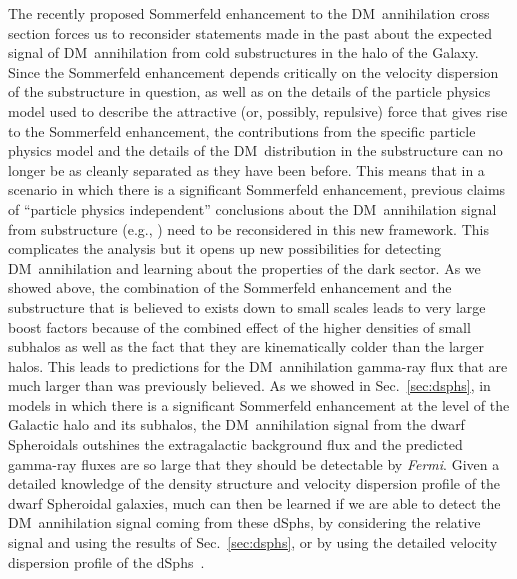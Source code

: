 \documentclass[aps,prd,twocolumn,amsmath,amssymb,floatfix,nofootinbib,10pt]{revtex4}
\newcommand{\eg}{e.g.}
\newcommand{\Fermi}{\emph{Fermi}}
\newcommand{\DM}{DM}
\newcommand{\dSphs}{dSphs}
\begin{document}
The recently proposed Sommerfeld enhancement to the \DM\ annihilation
cross section forces us to reconsider statements made in the past
about the expected signal of \DM\ annihilation from cold substructures
in the halo of the Galaxy. Since the Sommerfeld enhancement depends
critically on the velocity dispersion of the substructure in
question, as well as on the details of the particle physics model used
to describe the attractive (or, possibly, repulsive) force that gives
rise to the Sommerfeld enhancement, the contributions from the
specific particle physics model and the details of the \DM\
distribution in the substructure can no longer be as cleanly separated
as they have been before. This means that in a scenario in which there
is a significant Sommerfeld enhancement, previous claims of ``particle
physics independent'' conclusions about the \DM\ annihilation signal
from substructure (\eg,
\cite{2007PhRvD..75h3526S,2008Natur.456...73S}) need to be
reconsidered in this new framework. This complicates the analysis but
it opens up new possibilities for detecting \DM\ annihilation and
learning about the properties of the dark sector. As we showed above,
the combination of the Sommerfeld enhancement and the substructure
that is believed to exists down to small scales leads to very large
boost factors because of the combined effect of the higher densities
of small subhalos as well as the fact that they are kinematically
colder than the larger halos. This leads to predictions for the \DM\
annihilation gamma-ray flux that are much larger than was previously
believed. As we showed in Sec.~\ref{sec:dsphs}, in models in which
there is a significant Sommerfeld enhancement at the level of the
Galactic halo and its subhalos, the \DM\ annihilation signal from the
dwarf Spheroidals outshines the extragalactic background flux and the
predicted gamma-ray fluxes are so large that they should be detectable
by \Fermi. Given a detailed knowledge of the density structure and
velocity dispersion profile of the dwarf Spheroidal galaxies, much can
then be learned if we are able to detect the \DM\ annihilation signal
coming from these \dSphs, by considering the relative signal and using
the results of Sec.~\ref{sec:dsphs}, or by using the detailed velocity
dispersion profile of the \dSphs\ \cite{2009arXiv0902.0362R}.
\end{document}
